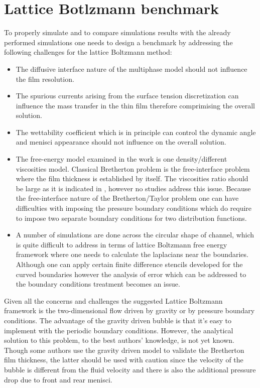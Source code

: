 \documentclass{article}
\begin{document}
\section{Lattice Botlzmann benchmark}
To properly simulate and to compare simulations results with the already
performed simulations one needs to design a benchmark by addressing the
following challenges for the lattice Boltzmann method:
\begin{itemize}
 \item The diffusive interface nature of the multiphase model should not
influence the film resolution.
 \item The spurious currents arising from the surface tension discretization
can influence the mass transfer in the thin film therefore comprimising the
overall solution.
 \item The wettability coefficient which is in principle can control the
dynamic angle and menisci appearance \cite{pagonabarraga-finger} should not
influence on the overall solution.
 \item The free-energy model examined in the work is one density/different
viscosities model. Classical Bretherton problem is the free-interface problem
where the film thickness is established by itself. The viscosities ratio should
be large as it is indicated in \cite{pagonabarraga-fingers}, however no studies
address this issue. Because the free-interface nature of the Bretherton/Taylor
problem one can have difficulties with imposing the pressure boundary
conditions which do require to impose two separate boundary conditions for two
distribution functions.
 \item A number of simulations are done across the circular shape of channel,
which is quite difficult to address in terms of lattice Boltzmann free energy
framework where one needs to calculate the laplacians near the boundaries.
Although one can apply certain finite difference stencils
\cite{arnold-boundary,hunt-boundary} developed for the curved boundaries
however the analysis of error which can be addressed to the boundary conditions
treatment becomes an issue. 
\end{itemize}
Given all the concerns and challenges the suggested Lattice Boltzmann framework
is the two-dimensional flow driven by gravity or by pressure boundary
conditions. The advantage of the gravity driven bubble is that it's easy to
implement with the periodic boundary conditions. However, the analytical
solution to this problem, to the best authors' knowledge, is not yet known.
Though some authors \cite{sehgal-microchannel} use the gravity driven model to
validate the Bretherton film thickness, the latter should be used with caution
since the velocity of the bubble is different from the fluid velocity and there
is also the additional pressure drop due to front and rear menisci. 
\end{document}
